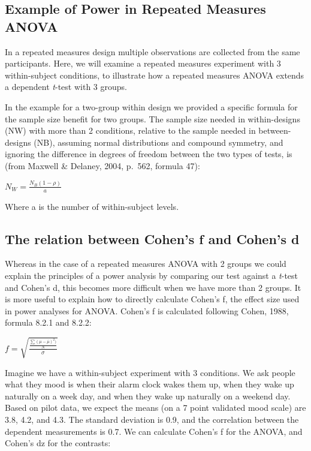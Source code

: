 \documentclass[]{article}
\title{}
\author{}
\date{}
\begin{document}
\subsection{Example of Power in Repeated Measures
ANOVA}\label{example-of-power-in-repeated-measures-anova}

In a repeated measures design multiple observations are collected from
the same participants. Here, we will examine a repeated measures
experiment with 3 within-subject conditions, to illustrate how a
repeated measures ANOVA extends a dependent \emph{t}-test with 3 groups.

In the example for a two-group within design we provided a specific
formula for the sample size benefit for two groups. The sample size
needed in within-designs (NW) with more than 2 conditions, relative to
the sample needed in between-designs (NB), assuming normal distributions
and compound symmetry, and ignoring the difference in degrees of freedom
between the two types of tests, is (from Maxwell \& Delaney, 2004,
p.~562, formula 47):

\(N_{W}=\frac{N_{B}(1-\rho)}{a}\)

Where a is the number of within-subject levels.

\subsection{The relation between Cohen's f and Cohen's
d}\label{the-relation-between-cohens-f-and-cohens-d}

Whereas in the case of a repeated measures ANOVA with 2 groups we could
explain the principles of a power analysis by comparing our test against
a \emph{t}-test and Cohen's d, this becomes more difficult when we have
more than 2 groups. It is more useful to explain how to directly
calculate Cohen's f, the effect size used in power analyses for ANOVA.
Cohen's f is calculated following Cohen, 1988, formula 8.2.1 and 8.2.2:

\(f = \sqrt{\frac{\frac{\sum(\mu-\overline{\mu})^2)}N}\sigma}\)

Imagine we have a within-subject experiment with 3 conditions. We ask
people what they mood is when their alarm clock wakes them up, when they
wake up naturally on a week day, and when they wake up naturally on a
weekend day. Based on pilot data, we expect the means (on a 7 point
validated mood scale) are 3.8, 4.2, and 4.3. The standard deviation is
0.9, and the correlation between the dependent measurements is 0.7. We
can calculate Cohen's f for the ANOVA, and Cohen's dz for the contrasts:
\end{document}

